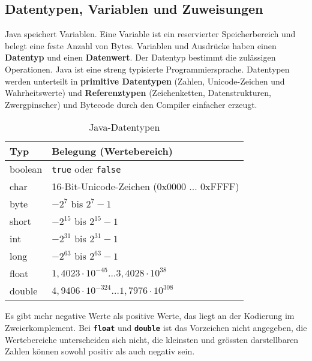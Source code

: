 \subsection{Datentypen, Variablen und Zuweisungen}
Java speichert Variablen. Eine Variable ist ein reservierter Speicherbereich und belegt eine feste Anzahl von Bytes. Variablen und Ausdrücke haben einen \textbf{Datentyp} und einen \textbf{Datenwert}. Der Datentyp bestimmt die zulässigen Operationen. Java ist eine streng typisierte Programmiersprache. Datentypen werden unterteilt in \textbf{primitive Datentypen} (Zahlen, Unicode-Zeichen und Wahrheitswerte) und \textbf{Referenztypen} (Zeichenketten, Datenstrukturen, Zwergpinscher) und Bytecode durch den Compiler einfacher erzeugt.
\begin{table}[H]
\centering
\begin{tabular}{|l|l|}
\hline
Typ&Belegung (Wertebereich)\\\hline
boolean&\texttt{true} oder \texttt{false}\\
char& 16-Bit-Unicode-Zeichen (0x0000 ... 0xFFFF)\\
byte&$-2^7$ bis $2^7-1$\\
short&$-2^{15}$ bis $2^{15}-1$\\
int&$-2^{31}$ bis $2^{31}-1$ \\
long&$-2^{63}$ bis $2^{63}-1$\\
float&$1,4023\cdot 10^{-45} \dotso 3,4028\cdot10^{38}$\\
double&$4,9406\cdot 10^{-324} \dotso 1,7976\cdot 10^{308}$\\\hline
\end{tabular}
\caption{Java-Datentypen}
\end{table}
\noindent Es gibt mehr negative Werte als positive Werte, das liegt an der Kodierung im Zweierkomplement. Bei \textbf{\texttt{float}} und \textbf{\texttt{double}} ist das Vorzeichen nicht angegeben, die Wertebereiche unterscheiden sich nicht, die kleinsten und grössten darstellbaren Zahlen können sowohl positiv als auch negativ sein.

















